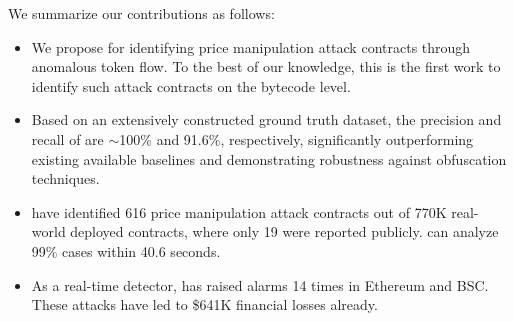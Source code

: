 We summarize our contributions as follows:

\begin{itemize}
    \item We propose {\tool} for identifying price manipulation attack contracts through anomalous token flow. To the best of our knowledge, this is the first work to identify such attack contracts on the bytecode level.
    \item Based on an extensively constructed ground truth dataset, the precision and recall of {\tool} are $\sim$100\% and 91.6\%, respectively, significantly outperforming existing available baselines and demonstrating robustness against obfuscation techniques.
    \item {\tool} have identified 616 price manipulation attack contracts out of  770K real-world deployed contracts, where only 19 were reported publicly. {\tool} can analyze 99\% cases within 40.6 seconds.
    \item As a real-time detector, {\tool} has raised alarms 14 times in Ethereum and BSC. These attacks have led to \$641K financial losses already.
\end{itemize}



